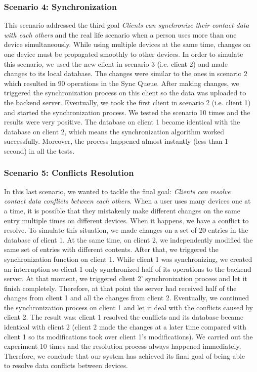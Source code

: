 \subsubsection{Scenario 4: Synchronization}
This scenario addressed the third goal \textit{Clients can synchronize their contact data with each others} and the real life scenario when a person uses more than one device simultaneously. While using multiple devices at the same time, changes on one device must be propagated smoothly to other devices. In order to simulate this scenario, we used the new client in scenario 3 (i.e. client 2) and made changes to its local database. The changes were similar to the ones in scenario 2 which resulted in 90 operations in the Sync Queue. After making changes, we triggered the synchronization process on this client so the data was uploaded to the backend server. Eventually, we took the first client in scenario 2 (i.e. client 1) and started the synchronization process. We tested the scenario 10 times and the results were very positive. The database on client 1 became identical with the database on client 2, which means the synchronization algorithm worked successfully. Moreover, the process happened almost instantly (less than 1 second) in all the tests.

\subsubsection{Scenario 5: Conflicts Resolution}
In this last scenario, we wanted to tackle the final goal: \textit{Clients can resolve contact data conflicts between each others}. When a user uses many devices one at a time, it is possible that they mistakenly make different changes on the same entry multiple times on different devices. When it happens, we have a conflict to resolve. To simulate this situation, we made changes on a set of 20 entries in the database of client 1. At the same time, on client 2, we independently modified the same set of entries with different contents. After that, we triggered the synchronization function on client 1. While client 1 was synchronizing, we created an interruption so client 1 only synchronized half of its operations to the backend server. At that moment, we triggered client 2' synchronization process and let it finish completely. Therefore, at that point the server had received half of the changes from client 1 and all the changes from client 2. Eventually, we continued the synchronization process on client 1 and let it deal with the conflicts caused by client 2. The result was: client 1 resolved the conflicts and its database became identical with client 2 (client 2 made the changes at a later time compared with client 1 so its modifications took over client 1's modifications). We carried out the experiment 10 times and the resolution process always happened immediately. Therefore, we conclude that our system has achieved its final goal of being able to resolve data conflicts between devices.

